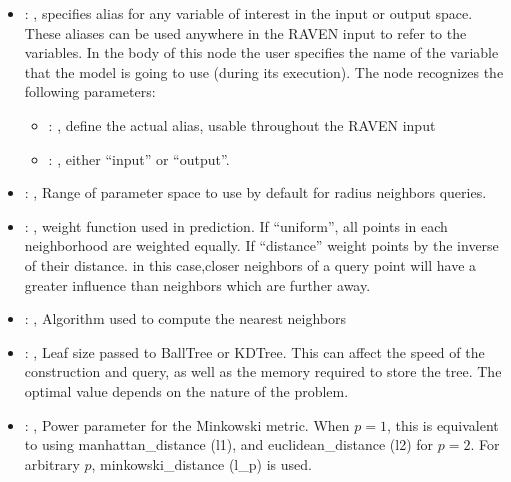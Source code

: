 \begin{itemize}
    \item {}: , 
      specifies alias for         any variable of interest in the input or output space. These
      aliases can be used anywhere in the RAVEN input to         refer to the variables. In the body
      of this node the user specifies the name of the variable that the model is going to use
      (during its execution).
      The  node recognizes the following parameters:
        \begin{itemize}
          \item {}: , 
            define the actual alias, usable throughout the RAVEN input
          \item {}: , 
            either ``input'' or ``output''.
      \end{itemize}

    \item {}: , 
      Range of parameter space to use by default for radius neighbors queries.

    \item {}: , 
      weight function used in prediction. If ``uniform'', all points in each neighborhood
      are weighted equally. If ``distance'' weight points by the inverse of their distance. in this
      case,closer neighbors of a query point will have a greater influence than neighbors which are
      further away.

    \item {}: , 
      Algorithm used to compute the nearest neighbors

    \item {}: , 
      Leaf size passed to BallTree or KDTree. This can affect the speed of the construction
      and query, as well as the memory required to store the tree. The optimal value depends on the
      nature of the problem.

    \item {}: , 
      Power parameter for the Minkowski metric. When $p = 1$, this is equivalent to using
      manhattan\_distance (l1), and euclidean\_distance (l2) for $p = 2$. For arbitrary $p$,
      minkowski\_distance                                                  (l\_p) is used.


\end{itemize}
